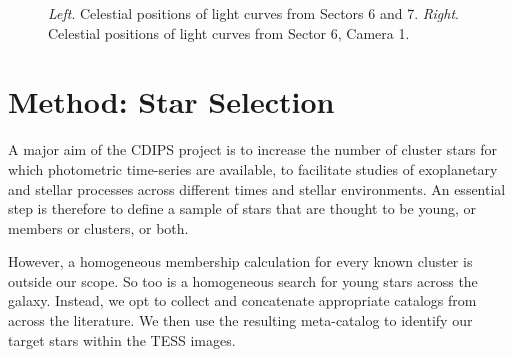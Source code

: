 \documentclass[12pt,twocolumn,tighten]{aastex62}
\begin{document}


\begin{figure}[!ht]
    \vspace{-0.5cm}
    \caption{
        {\it Left}. Celestial positions of light curves from Sectors 6 and 7.
        {\it Right}. Celestial positions of light curves from Sector 6, Camera 1.
        \label{fig:lcradecsector6}
    }
\end{figure}



\section{Method: Star Selection}
\label{sec:starselection}

A major aim of the CDIPS project is to increase the number of
cluster stars for which photometric time-series are
available, to facilitate studies of exoplanetary and stellar
processes across different times and stellar environments.
An essential step is therefore to define a sample of
stars that are thought to be young, or members or clusters, or both.

However, a homogeneous membership calculation for every known
cluster is outside our scope.  So too is a homogeneous search for
young stars across the galaxy.
Instead, we opt to collect
and concatenate appropriate catalogs from across the literature.  
We then use the resulting meta-catalog to identify our target stars within the 
TESS images.
\end{document}

